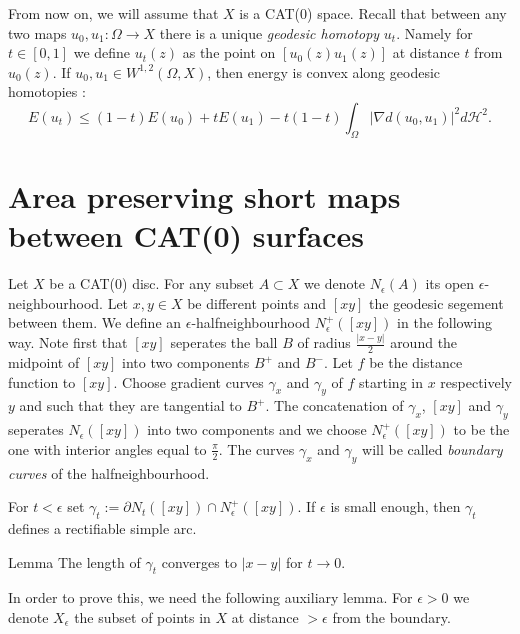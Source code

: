 \documentclass[a4paper,10pt]{amsart}
\begin{document}
From now on, we will assume that $X$ is a CAT(0) space. Recall that between any two maps $u_0,u_1:\Omega\to X$ there is 
a unique {\em geodesic homotopy} $u_t$. Namely for $t\in[0,1]$ we define $u_t(z)$ as the point on $[u_0(z)u_1(z)]$ at distance $t$
from $u_0(z)$. If $u_0, u_1\in W^{1,2}(\Omega,X)$, then energy is convex along geodesic homotopies \cite[(2.2vi)]{KS}:
$$
E(u_t)\leq (1-t)E(u_0)+tE(u_1)-t(1-t)\int_\Omega|\nabla d(u_0,u_1)|^2d\mathcal{H}^2.
$$


\section{Area preserving short maps between CAT(0) surfaces}

Let $X$ be a CAT(0) disc. For any subset $A\subset X$ we denote $N_\epsilon (A)$ its open $\epsilon$-neighbourhood.
Let $x,y\in X$ be different points and $[xy]$ the geodesic segement between them. We define an $\epsilon$-halfneighbourhood
$N^+_\epsilon ([xy])$ in the following way. Note first that $[xy]$ seperates the ball $B$ of radius $\frac{|x-y|}{2}$ around
the midpoint of $[xy]$ into two components $B^+$ and $B^-$. Let $f$ be the distance function to $[xy]$. Choose gradient curves 
$\gamma_x$ and $\gamma_y$ of $f$ starting in $x$ respectively $y$ and such that they are tangential to $B^+$. The concatenation
of $\gamma_x$, $[xy]$ and $\gamma_y$ seperates $N_\epsilon([xy])$ into two components and we choose $N^+_\epsilon ([xy])$ to be the one
with interior angles equal to  $\frac{\pi}{2}$. The curves $\gamma_x$ and $\gamma_y$ will be called {\em boundary curves} of the 
halfneighbourhood.


For $t<\epsilon$ set $\gamma_t:=\partial N_t([xy])\cap N^+_\epsilon ([xy])$. If $\epsilon$
is small enough, then $\gamma_t$ defines a rectifiable simple arc.


\begin{thm}{Lemma}\label{lem:length continuity}
The length of $\gamma_t$ converges to $|x-y|$ for $t\to 0$.
\end{thm}

In order to prove this, we need the following auxiliary lemma. For $\epsilon>0$ we denote
$X_\epsilon$ the subset of points in $X$ at distance $>\epsilon$ from the boundary.
\end{document}
